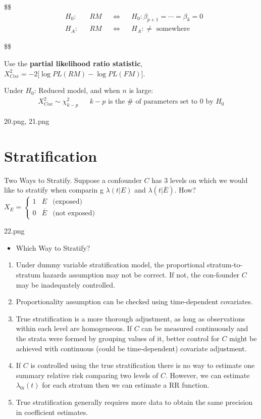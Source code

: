 \documentclass[
]{book}
\providecommand{\tightlist}{%
  \setlength{\itemsep}{0pt}\setlength{\parskip}{0pt}}
\theoremstyle{definition}
\theoremstyle{definition}
\theoremstyle{definition}
\theoremstyle{definition}
\theoremstyle{remark}
\begin{document}
\$\$
\begin{align}

&H_0:  &&RM && \Leftrightarrow && H_0: \beta_{p+1} = \cdots = \beta_k = 0
\\
&H_A:  &&RM && \Leftrightarrow && H_A:  \not = \text{ somewhere}

\end{align}

\$\$

Use the \textbf{partial likelihood ratio statistic}, \(X^2_{Cox} = -2 \Big[ \log PL(RM) - \log PL(FM)\Big]\).

Under \(H_0\): Reduced model, and when \(n\) is large:
\[
\begin{align}
X^2_{Cox} \sim \chi^2_{k-p} && k-p \text{ is the # of parameters set to 0 by }H_0
\end{align}
\]

20.png, 21.png

\hypertarget{stratification}{%
\section{Stratification}\label{stratification}}

Two Ways to Stratify. Suppose a confounder \(C\) has 3 levels on which we would like to stratify when comparin
g \(\lambda(t \Big | E )\) and \(\lambda ( t \Big | \bar E )\). How? \(X_E = \begin{cases}1&E&\text{(exposed)}\\0&\bar E&\text{(not exposed)}\end{cases}\)

22.png

\begin{itemize}
\tightlist
\item
  Which Way to Stratify?
\end{itemize}

\begin{enumerate}
\def\labelenumi{\arabic{enumi}.}
\tightlist
\item
  Under dummy variable stratification model, the proportional stratum-to-stratum hazards assumption may not be correct. If not, the con-founder \(C\) may be inadequately controlled.
\item
  Proportionality assumption can be checked using time-dependent covariates.
\item
  True stratification is a more thorough adjustment, as long as observations within each level are homogeneous. If \(C\) can be measured continuously and the strata were formed by grouping values of it, better control for \(C\) might be achieved with continuous (could be time-dependent) covariate adjustment.
\item
  If \(C\) is controlled using the true stratification there is no way to estimate one summary relative risk comparing two levels of \(C\). However, we can estimate \(\lambda_{0i}(t)\) for each stratum then we can estimate a RR function.
\item
  True stratification generally requires more data to obtain the same precision in coefficient estimates.
\end{enumerate}
\end{document}
